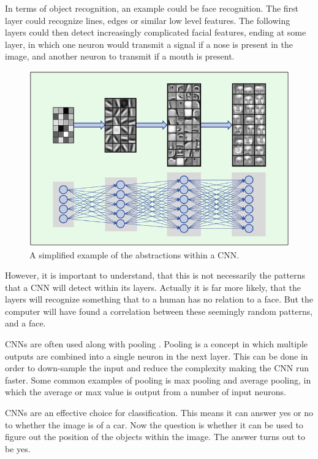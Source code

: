 In terms of object recognition, an example could be face recognition.
The first layer could recognize lines, edges or similar low level features.
The following layers could then detect increasingly complicated facial features, ending at some layer, in which one neuron would transmit a signal if a nose is present in the image, and another neuron to transmit if a mouth is present.


\begin{figure}[H]
	\centering
	\includegraphics[scale=0.40]{images/cnn_face.jpg}
	\caption{A simplified example of the abstractions within a CNN.}
	\label{fig:face_cnn}
\end{figure}
 
However, it is important to understand, that this is not necessarily the patterns that a CNN will detect within its layers.
Actually it is far more likely, that the layers will recognize something that to a human has no relation to a face.
But the computer will have found a correlation between these seemingly random patterns, and a face.

CNNs are often used along with pooling \cite{CNN}.
Pooling is a concept in which multiple outputs are combined into a single neuron in the next layer.
This can be done in order to down-sample the input and reduce the complexity making the CNN run faster.
Some common examples of pooling is max pooling and average pooling, in which the average or max value is output from a number of input neurons.

CNNs are an effective choice for classification. 
This means it can answer yes or no to whether the image is of a car.
Now the question is whether it can be used to figure out the position of the objects within the image.
The answer turns out to be yes.


